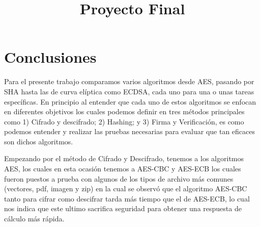 \documentclass[onecolumn]{IEEEtran}
\begin{document}


\title{Proyecto Final}
\author{
  }

\maketitle{}

\tableofcontents{}



\newpage{}



\clearpage{}

\section{Conclusiones}\label{sec:concluciones}
Para el presente trabajo comparamos varios algoritmos desde AES, pasando por SHA hasta las de curva elíptica como ECDSA, cada uno para una o unas tareas específicas. En principio al entender que cada uno de estos algoritmos se enfocan en diferentes objetivos los cuales podemos definir en tres métodos principales como 1) Cifrado y descifrado; 2) Hashing; y 3) Firma y Verificación, es como podemos entender y realizar las pruebas necesarias para evaluar que tan eficaces son dichos algoritmos.

Empezando por el método de Cifrado y Descifrado, tenemos a los algoritmos AES, los cuales en esta ocasión tenemos a AES-CBC y AES-ECB los cuales fueron puestos a prueba con algunos de los tipos de archivo más comunes (vectores, pdf, imagen y zip) en la cual se observó que el algoritmo AES-CBC tanto para cifrar como descifrar tarda más tiempo que el de AES-ECB, lo cual nos indica que este ultimo sacrifica seguridad para obtener una respuesta de cálculo más rápida.
\end{document}

